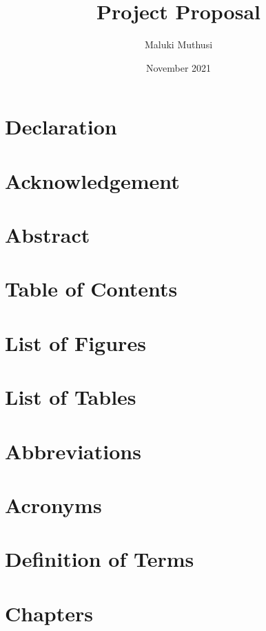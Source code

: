 \documentclass{article}
\title{Project Proposal}
\author{Maluki Muthusi}
\date{November 2021}
\begin{document}
\maketitle

%
\section{Declaration}

%
\section{Acknowledgement}

%
\section{Abstract}


%
\section{Table of Contents}

%
\section{List of Figures}

%
\section{List of Tables}

%
\section{Abbreviations}

%
\section{Acronyms}

%
\section{Definition of Terms}

%
\section{Chapters}
\end{document}
